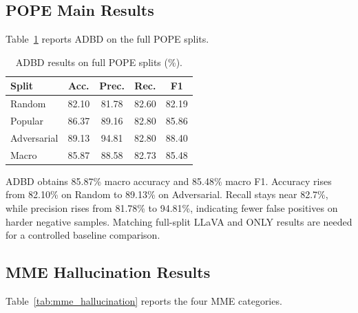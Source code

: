 \subsection{POPE Main Results}

Table~\ref{tab:pope_results} reports ADBD on the full POPE splits.

\begin{table}[t]
\centering
\small
\setlength{\tabcolsep}{4pt}
\begin{tabular}{lcccc}
\toprule
Split & Acc. & Prec. & Rec. & F1 \\
\midrule
Random      & 82.10 & 81.78 & 82.60 & 82.19 \\
Popular     & 86.37 & 89.16 & 82.80 & 85.86 \\
Adversarial & 89.13 & 94.81 & 82.80 & 88.40 \\
\midrule
Macro       & 85.87 & 88.58 & 82.73 & 85.48 \\
\bottomrule
\end{tabular}
\caption{ADBD results on full POPE splits (\%).}
\label{tab:pope_results}
\end{table}

ADBD obtains 85.87\% macro accuracy and 85.48\% macro F1. Accuracy rises from 82.10\% on Random to 89.13\% on Adversarial. Recall stays near 82.7\%, while precision rises from 81.78\% to 94.81\%, indicating fewer false positives on harder negative samples. Matching full-split LLaVA and ONLY results are needed for a controlled baseline comparison.

\subsection{MME Hallucination Results}

Table~\ref{tab:mme_hallucination} reports the four MME categories.

\begin{table}[t]
\centering
\small
\setlength{\tabcolsep}{3pt}
\caption{MME Hallucination scores.}
\label{tab:mme_hallucination}
\end{table}

